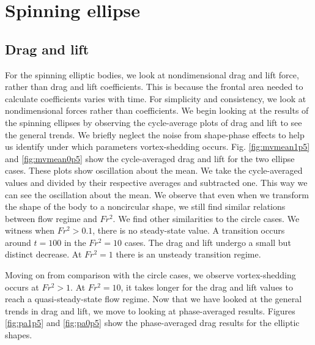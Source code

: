 \section{Spinning ellipse}
\label{section:Spinning_ellipse}
\subsection{Drag and lift}
For the spinning elliptic bodies, we look at nondimensional drag and lift force, rather than drag and lift coefficients. This is because the frontal area needed to calculate coefficients varies with time. For simplicity and consistency, we look at nondimensional forces rather than coefficients. We begin looking at the results of the spinning ellipses by observing the cycle-average plots of drag and lift to see the general trends. We briefly neglect the noise from shape-phase effects to help us identify under which parameters vortex-shedding occurs. Fig. \ref{fig:mvmean1p5} and \ref{fig:mvmean0p5} show the cycle-averaged drag and lift for the two ellipse cases. These plots show oscillation about the mean. We take the cycle-averaged values and divided by their respective averages and subtracted one. This way we can see the oscillation about the mean. We observe that even when we transform the shape of the body to a noncircular shape, we still find similar relations between flow regime and $Fr^2$. We find other similarities to the circle cases. We witness when $Fr^2 > 0.1$, there is no steady-state value. A transition occurs around $t = 100$ in the $Fr^2 = 10$ cases. The drag and lift undergo a small but distinct decrease. At $Fr^2 = 1$ there is an unsteady transition regime. 

Moving on from comparison with the circle cases, we observe vortex-shedding occurs at $Fr^2 > 1$. At $Fr^2 = 10$, it takes longer for the drag and lift values to reach a quasi-steady-state flow regime. Now that we have looked at the general trends in drag and lift, we move to looking at phase-averaged results. Figures \ref{fig:pa1p5} and \ref{fig:pa0p5} show the phase-averaged drag results for the elliptic shapes. 


